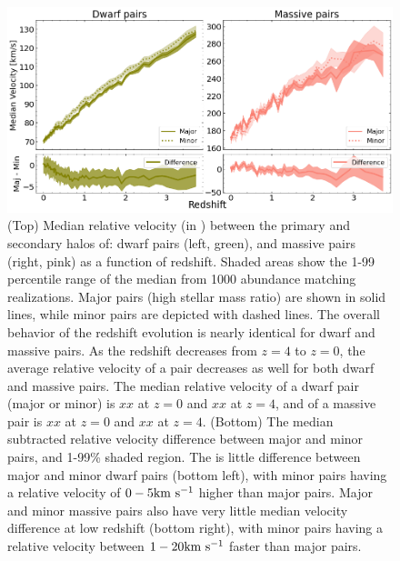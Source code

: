 \documentclass[twocolumn]{aastex631}
\begin{document}
\begin{figure}[htb]
  \centering
  \includegraphics[width=\textwidth]{velocity.png}
  \caption{
    (Top) Median relative velocity (in \kms) between the primary and secondary halos of: dwarf pairs (left, green), and massive pairs (right, pink) as a function of redshift. 
    Shaded areas show the 1-99 percentile range of the median from 1000 abundance matching realizations. Major pairs (high stellar mass ratio) are shown in solid lines, while minor pairs are depicted with dashed lines.
    The overall behavior of the redshift evolution is nearly identical for dwarf and massive pairs.
    As the redshift decreases from $z=4$ to $z=0$, the average relative velocity of a pair decreases as well for both dwarf and massive pairs.
    The median relative velocity of a dwarf pair (major or minor) is $xx$ at $z=0$ and $xx$ at $z=4$, and of a massive pair is $xx$ at $z=0$ and $xx$ at $z=4$. 
    (Bottom) The median subtracted relative velocity difference between major and minor pairs, and 1-99\% shaded region.
    The is little difference between major and minor dwarf pairs (bottom left), with minor pairs having a relative velocity of $0-5\mathrm{km}~\mathrm{s}^{-1}$ higher than major pairs. 
    Major and minor massive pairs also have very little median velocity difference at low redshift (bottom right), with minor pairs having a relative velocity between $1-20\mathrm{km}~\mathrm{s}^{-1}$ faster than major pairs.  
    }
  \label{fig:vel}
\end{figure}
\end{document}
